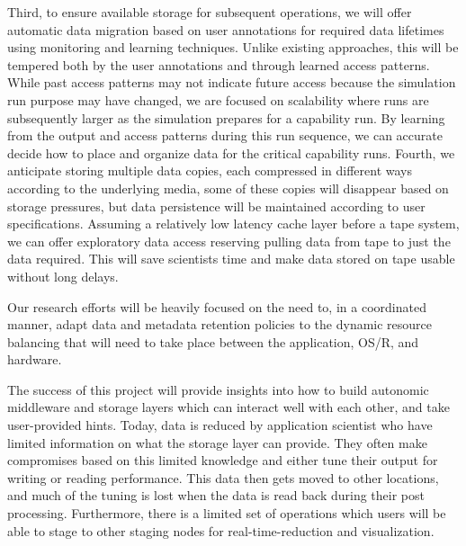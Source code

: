 \documentclass[11pt,letterpaper]{article}
\begin{document}
Third, to ensure available storage for subsequent operations, we will offer
automatic data migration based on user annotations for required data lifetimes
using monitoring and learning techniques. Unlike existing approaches, this will
be tempered both by the user annotations and through learned access patterns.
While past access patterns may not indicate future access because the
simulation run purpose may have changed, we are focused on scalability where
runs are subsequently larger as the simulation prepares for a capability run.
By learning from the output and access patterns during this run sequence, we
can accurate decide how to place and organize data for the critical capability
runs. Fourth, we anticipate storing multiple data copies, each compressed in
different ways according to the underlying media, some of these copies will
disappear based on storage pressures, but data persistence will be maintained
according to user specifications. Assuming a relatively low latency cache layer
before a tape system, we can offer exploratory data access reserving pulling
data from tape to just the data required. This will save scientists time and
make data stored on tape usable without long delays.

Our research efforts will be heavily focused on the need to, in a coordinated
manner, adapt data and metadata retention policies to the dynamic
resource balancing that will need to take place between the application,
OS/R, and hardware.

The success of this project will  provide insights into how to build autonomic middleware and storage layers which can interact
well with each other, and take user-provided hints. Today, data is reduced by application scientist who have 
limited information on what the storage layer can provide. They often make compromises based on this limited knowledge
and either tune their output for writing or reading performance. This data then gets moved to other locations, and much of
the tuning is lost when the data is read back during their post processing. Furthermore, there is a limited set of operations
which users will be able to stage to other staging nodes for real-time-reduction and visualization. 





%
\end{document}
